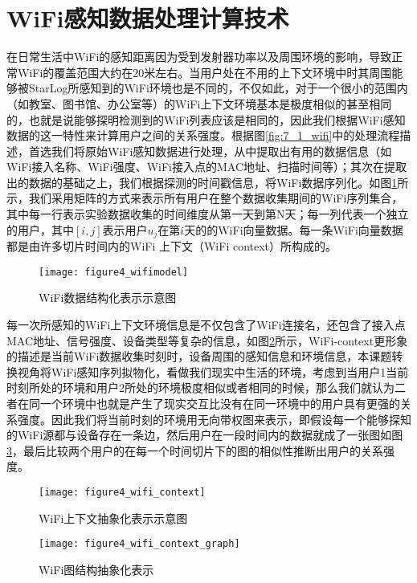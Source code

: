 \section{WiFi感知数据处理计算技术}
\label{wifi_pro_tec}
在日常生活中WiFi的感知距离因为受到发射器功率以及周围环境的影响，导致正常WiFi的覆盖范围大约在20米左右。当用户处在不用的上下文环境中时其周围能够被StarLog所感知到的WiFi环境也是不同的，不仅如此，对于一个很小的范围内（如教室、图书馆、办公室等）的WiFi上下文环境基本是极度相似的甚至相同的，也就是说能够探明检测到的WiFi列表应该是相同的，因此我们根据WiFi感知数据的这一特性来计算用户之间的关系强度。根据图\ref{fig:7_1_wifi}中的处理流程描述，首选我们将原始WiFi感知数据进行处理，从中提取出有用的数据信息（如WiFi接入名称、WiFi强度、WiFi接入点的MAC地址、扫描时间等）；其次在提取出的数据的基础之上，我们根据探测的时间戳信息，将WiFi数据序列化。如图\ref{fig:wifimodel_process}所示，我们采用矩阵的方式来表示所有用户在整个数据收集期间的WiFi序列集合，其中每一行表示实验数据收集的时间维度从第一天到第N天；每一列代表一个独立的用户，其中$[i,j]$表示用户$u_{j}$在第$i$天的的WiFi向量数据。每一条WiFi向量数据都是由许多切片时间内的WiFi 上下文（WiFi context）所构成的。
\begin{figure}[htp]
\centering
\texttt{[image: figure4\_wifimodel]}
\caption{WiFi数据结构化表示示意图}
\label{fig:wifimodel_process}
\end{figure}
\par 每一次所感知的WiFi上下文环境信息是不仅包含了WiFi连接名，还包含了接入点MAC地址、信号强度、设备类型等复杂的信息，如图\ref{fig:wifi_context}所示，WiFi-context更形象的描述是当前WiFi数据收集时刻时，设备周围的感知信息和环境信息，本课题转换视角将WiFi感知序列拟物化，看做我们现实中生活的环境，考虑到当用户1当前时刻所处的环境和用户2所处的环境极度相似或者相同的时候，那么我们就认为二者在同一个环境中也就是产生了现实交互比没有在同一环境中的用户具有更强的关系强度。因此我们将当前时刻的环境用无向带权图来表示，即假设每一个能够探知的WiFi源都与设备存在一条边，然后用户在一段时间内的数据就成了一张图如图\ref{fig:wifi_context_graph}，最后比较两个用户的在每一个时间切片下的图的相似性推断出用户的关系强度。
\begin{figure}[htp]
\centering
\texttt{[image: figure4\_wifi\_context]}
\caption{WiFi上下文抽象化表示示意图}
\label{fig:wifi_context}
\end{figure}

\begin{figure}[htp]
\centering
\texttt{[image: figure4\_wifi\_context\_graph]}
\caption{WiFi图结构抽象化表示}
\label{fig:wifi_context_graph}
\end{figure}
